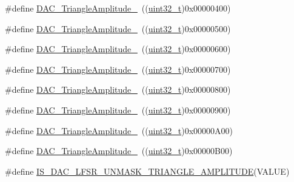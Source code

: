 \begin{DoxyCompactItemize}
\item 
\#define \hyperlink{group___d_a_c__lfsrunmask__triangleamplitude_ga10b15745b749c62a56bd3d7bd5a27e1b}{D\+A\+C\+\_\+\+Triangle\+Amplitude\+\_}~((\hyperlink{_p_e___types_8h_a33594304e786b158f3fb30289278f5af}{uint32\+\_\+t})0x00000400)
\item 
\#define \hyperlink{group___d_a_c__lfsrunmask__triangleamplitude_gaaae92dae9c4da55e29c645396825e36b}{D\+A\+C\+\_\+\+Triangle\+Amplitude\+\_}~((\hyperlink{_p_e___types_8h_a33594304e786b158f3fb30289278f5af}{uint32\+\_\+t})0x00000500)
\item 
\#define \hyperlink{group___d_a_c__lfsrunmask__triangleamplitude_gaacec0af3f69db46f8984be3af9ecadfb}{D\+A\+C\+\_\+\+Triangle\+Amplitude\+\_}~((\hyperlink{_p_e___types_8h_a33594304e786b158f3fb30289278f5af}{uint32\+\_\+t})0x00000600)
\item 
\#define \hyperlink{group___d_a_c__lfsrunmask__triangleamplitude_gadb404422c86a7b92d78e6d9617e8ce4d}{D\+A\+C\+\_\+\+Triangle\+Amplitude\+\_}~((\hyperlink{_p_e___types_8h_a33594304e786b158f3fb30289278f5af}{uint32\+\_\+t})0x00000700)
\item 
\#define \hyperlink{group___d_a_c__lfsrunmask__triangleamplitude_ga565b0c97bbdf152756617d491bf8ef85}{D\+A\+C\+\_\+\+Triangle\+Amplitude\+\_}~((\hyperlink{_p_e___types_8h_a33594304e786b158f3fb30289278f5af}{uint32\+\_\+t})0x00000800)
\item 
\#define \hyperlink{group___d_a_c__lfsrunmask__triangleamplitude_ga7d573b0cebb1b939bd83367effb93d89}{D\+A\+C\+\_\+\+Triangle\+Amplitude\+\_}~((\hyperlink{_p_e___types_8h_a33594304e786b158f3fb30289278f5af}{uint32\+\_\+t})0x00000900)
\item 
\#define \hyperlink{group___d_a_c__lfsrunmask__triangleamplitude_gad33d28d7fcc09d84500ea9b6e6c5feed}{D\+A\+C\+\_\+\+Triangle\+Amplitude\+\_}~((\hyperlink{_p_e___types_8h_a33594304e786b158f3fb30289278f5af}{uint32\+\_\+t})0x00000\+A00)
\item 
\#define \hyperlink{group___d_a_c__lfsrunmask__triangleamplitude_ga3ce69f5a63a2464dc4b5f73cb6fe72f5}{D\+A\+C\+\_\+\+Triangle\+Amplitude\+\_}~((\hyperlink{_p_e___types_8h_a33594304e786b158f3fb30289278f5af}{uint32\+\_\+t})0x00000\+B00)
\item 
\#define \hyperlink{group___d_a_c__lfsrunmask__triangleamplitude_ga20f7c3c43f917f14593f0c478c2412e1}{I\+S\+\_\+\+D\+A\+C\+\_\+\+L\+F\+S\+R\+\_\+\+U\+N\+M\+A\+S\+K\+\_\+\+T\+R\+I\+A\+N\+G\+L\+E\+\_\+\+A\+M\+P\+L\+I\+T\+U\+DE}(V\+A\+L\+UE)
\item 

\end{DoxyCompactItemize}
